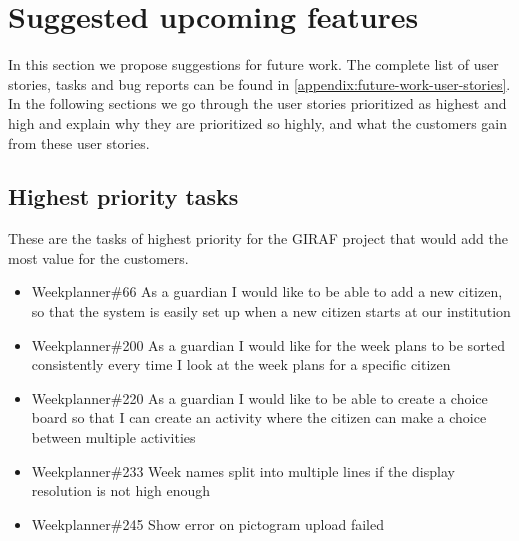 \section{Suggested upcoming features}\label{SuggestedUpcomingFeatures}
In this section we propose suggestions for future work. 
The complete list of user stories, tasks and bug reports can be found in \autoref{appendix:future-work-user-stories}.
In the following sections we go through the user stories prioritized as highest and high and explain why they are prioritized so highly, and what the customers gain from these user stories.

\subsection{Highest priority tasks}\label{highest-priority-tasks}
These are the tasks of highest priority for the GIRAF project that would add the most value for the customers.

\begin{itemize}
    \item Weekplanner\#66 As a guardian I would like to be able to add a new citizen, so that the system is easily set up when a new citizen starts at our institution
    \item Weekplanner\#200 As a guardian I would like for the week plans to be sorted consistently every time I look at the week plans for a specific citizen
    \item Weekplanner\#220 As a guardian I would like to be able to create a choice board so that I can create an activity where the citizen can make a choice between multiple activities 
    \item Weekplanner\#233 Week names split into multiple lines if the display resolution is not high enough 
    \item Weekplanner\#245 Show error on pictogram upload failed
\end{itemize}

